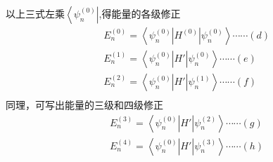 \begin{frame} 
  \frametitle{}
以上三式左乘$\left\langle  \psi_n^{(0)} \right\vert$,得能量的各级修正
\[
  \begin{aligned}
    & E_n^{(0)} = \left\langle  \psi_n^{(0)} \right\vert H^{(0)} \left\vert \psi_n^{(0)} \right\rangle \cdots\cdots (d)\\
    & E_n^{(1)} = \left\langle  \psi_n^{(0)} \right\vert H' \left\vert \psi_n^{(0)} \right\rangle \cdots\cdots (e)\\
    & E_n^{(2)} = \left\langle  \psi_n^{(0)} \right\vert H' \left\vert \psi_n^{(1)} \right\rangle \cdots\cdots (f)\\
  \end{aligned} 
  \]
  同理，可写出能量的三级和四级修正
  \[
  \begin{aligned}
    & E_n^{(3)} = \left\langle  \psi_n^{(0)} \right\vert H' \left\vert \psi_n^{(2)} \right\rangle \cdots\cdots (g)\\
    & E_n^{(4)} = \left\langle  \psi_n^{(0)} \right\vert H' \left\vert \psi_n^{(3)} \right\rangle \cdots\cdots (h)\\
  \end{aligned} 
  \]
\end{frame} 


